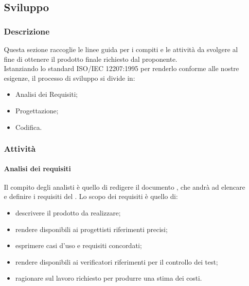 \subsection{Sviluppo}

	\subsubsection{Descrizione}
	Questa sezione raccoglie le linee guida per i compiti e le attività da svolgere al fine di ottenere il prodotto finale richiesto dal proponente.\\
	Istanziando lo standard ISO/IEC 12207:1995 per renderlo conforme alle nostre esigenze, il processo di sviluppo si divide in:
	\begin{itemize}
		\item Analisi dei Requisiti;
		\item Progettazione;
		\item Codifica.
	\end{itemize}

	\subsubsection{Attività}
        \paragraph{Analisi dei requisiti}
			Il compito degli analisti è quello di redigere il documento , che andrà ad elencare e definire i requisiti del . Lo scopo dei requisiti è quello di:
			\begin{itemize}
				\item descrivere il prodotto da realizzare;
				\item rendere disponibili ai progettisti riferimenti precisi;
				\item esprimere casi d'uso e requisiti concordati;
				\item rendere disponibili ai verificatori riferimenti per il controllo dei test;
				\item ragionare sul lavoro richiesto per produrre una stima dei costi.
			\end{itemize}

